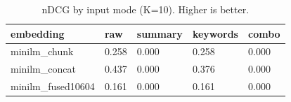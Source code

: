 \begin{table}
\caption{nDCG by input mode (K=10). Higher is better.}
\label{tab:ndcg-by-mode}
\begin{tabular}{lllll}
\toprule
embedding & raw & summary & keywords & combo \\
\midrule
minilm_chunk & 0.258 & 0.000 & 0.258 & 0.000 \\
minilm_concat & 0.437 & 0.000 & 0.376 & 0.000 \\
minilm_fused10604 & 0.161 & 0.000 & 0.161 & 0.000 \\
\bottomrule
\end{tabular}
\end{table}
